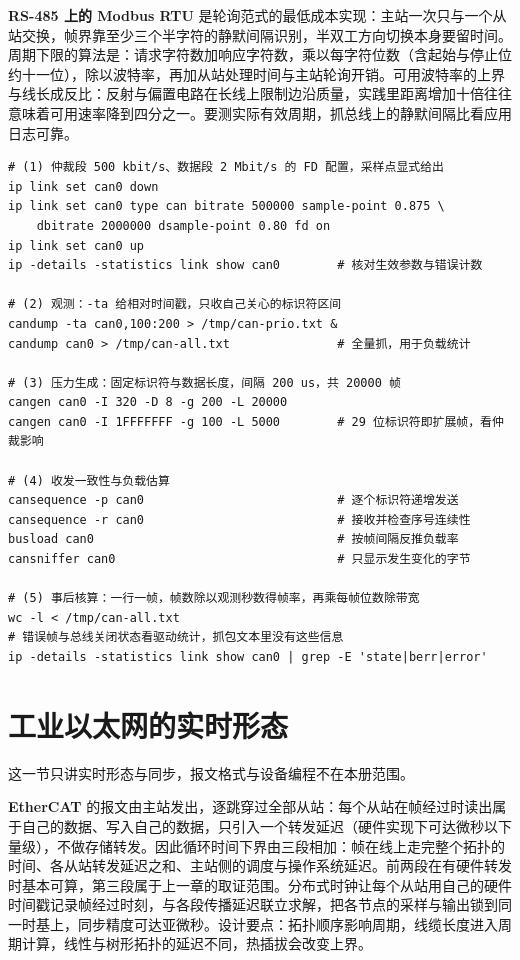 \documentclass[12pt,a4paper,fontset=fandol]{ctexbook}
\begin{document}
\textbf{RS-485 上的 Modbus RTU} 是轮询范式的最低成本实现：主站一次只与一个从站交换，帧界靠至少三个半字符的静默间隔识别，半双工方向切换本身要留时间。周期下限的算法是：请求字符数加响应字符数，乘以每字符位数（含起始与停止位约十一位），除以波特率，再加从站处理时间与主站轮询开销。可用波特率的上界与线长成反比：反射与偏置电路在长线上限制边沿质量，实践里距离增加十倍往往意味着可用速率降到四分之一。要测实际有效周期，抓总线上的静默间隔比看应用日志可靠。

\begin{lstlisting}[style=shellstyle,caption={Shell：CAN 与 CAN FD 的观测、压力生成与负载测量},label={lst:ch12-can}]
# (1) 仲裁段 500 kbit/s、数据段 2 Mbit/s 的 FD 配置，采样点显式给出
ip link set can0 down
ip link set can0 type can bitrate 500000 sample-point 0.875 \
    dbitrate 2000000 dsample-point 0.80 fd on
ip link set can0 up
ip -details -statistics link show can0        # 核对生效参数与错误计数

# (2) 观测：-ta 给相对时间戳，只收自己关心的标识符区间
candump -ta can0,100:200 > /tmp/can-prio.txt &
candump can0 > /tmp/can-all.txt               # 全量抓，用于负载统计

# (3) 压力生成：固定标识符与数据长度，间隔 200 us，共 20000 帧
cangen can0 -I 320 -D 8 -g 200 -L 20000
cangen can0 -I 1FFFFFFF -g 100 -L 5000        # 29 位标识符即扩展帧，看仲裁影响

# (4) 收发一致性与负载估算
cansequence -p can0                           # 逐个标识符递增发送
cansequence -r can0                           # 接收并检查序号连续性
busload can0                                  # 按帧间隔反推负载率
cansniffer can0                               # 只显示发生变化的字节

# (5) 事后核算：一行一帧，帧数除以观测秒数得帧率，再乘每帧位数除带宽
wc -l < /tmp/can-all.txt
# 错误帧与总线关闭状态看驱动统计，抓包文本里没有这些信息
ip -details -statistics link show can0 | grep -E 'state|berr|error'
\end{lstlisting}

\section{工业以太网的实时形态}

这一节只讲实时形态与同步，报文格式与设备编程不在本册范围。

\textbf{EtherCAT} 的报文由主站发出，逐跳穿过全部从站：每个从站在帧经过时读出属于自己的数据、写入自己的数据，只引入一个转发延迟（硬件实现下可达微秒以下量级），不做存储转发。因此循环时间下界由三段相加：帧在线上走完整个拓扑的时间、各从站转发延迟之和、主站侧的调度与操作系统延迟。前两段在有硬件转发时基本可算，第三段属于上一章的取证范围。分布式时钟让每个从站用自己的硬件时间戳记录帧经过时刻，与各段传播延迟联立求解，把各节点的采样与输出锁到同一时基上，同步精度可达亚微秒。设计要点：拓扑顺序影响周期，线缆长度进入周期计算，线性与树形拓扑的延迟不同，热插拔会改变上界。
\end{document}
